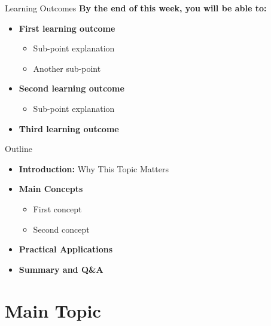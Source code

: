 \documentclass[aspectratio=169, 11pt]{beamer}
\begin{document}
\begin{frame}{Learning Outcomes}
  \textbf{By the end of this week, you will be able to:}
  \begin{itemize}
    \item \textbf{First learning outcome}
      \begin{itemize}
        \item Sub-point explanation
        \item Another sub-point
      \end{itemize}
    \item \textbf{Second learning outcome}
      \begin{itemize}
        \item Sub-point explanation
      \end{itemize}
    \item \textbf{Third learning outcome}
  \end{itemize}
\end{frame}

\begin{frame}{Outline}
  \begin{itemize}
    \item \textbf{Introduction:} Why This Topic Matters
    \item \textbf{Main Concepts}
      \begin{itemize}
        \item First concept
        \item Second concept
      \end{itemize}
    \item \textbf{Practical Applications}
    \item \textbf{Summary and Q\&A}
  \end{itemize}
\end{frame}

\section{Main Topic}
\end{document}
